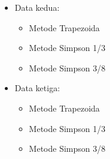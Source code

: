 \documentclass{article}
\begin{document}
\begin{enumerate}
\begin{itemize}
\begin{itemize}
        \end{itemize}
        \item Data kedua: \\
        \begin{itemize}
            \item Metode Trapezoida \\
            \item Metode Simpson 1/3 \\
            \item Metode Simpson 3/8 \\
        \end{itemize}
        \item Data ketiga: \\
        \begin{itemize}
            \item Metode Trapezoida \\
            \item Metode Simpson 1/3 \\
            \item Metode Simpson 3/8 \\
        \end{itemize}

    \end{itemize}


\end{enumerate}
\end{document}

